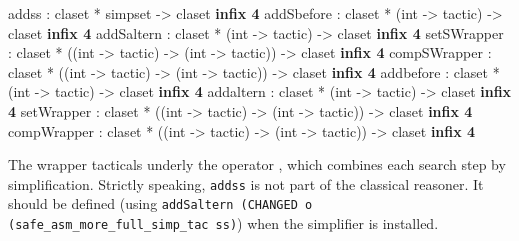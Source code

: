 \begin{ttbox} 
addss        : claset * simpset -> claset                 \hfill{\bf infix 4}
addSbefore   : claset *  (int -> tactic)  -> claset       \hfill{\bf infix 4}
addSaltern   : claset *  (int -> tactic)  -> claset       \hfill{\bf infix 4}
setSWrapper  : claset * ((int -> tactic) -> 
                         (int -> tactic)) -> claset       \hfill{\bf infix 4}
compSWrapper : claset * ((int -> tactic) -> 
                         (int -> tactic)) -> claset       \hfill{\bf infix 4}
addbefore    : claset *  (int -> tactic)  -> claset       \hfill{\bf infix 4}
addaltern    : claset *  (int -> tactic)  -> claset       \hfill{\bf infix 4}
setWrapper   : claset * ((int -> tactic) -> 
                         (int -> tactic)) -> claset       \hfill{\bf infix 4}
compWrapper  : claset * ((int -> tactic) -> 
                         (int -> tactic)) -> claset       \hfill{\bf infix 4}
\end{ttbox}
%
The wrapper tacticals underly the operator , which combines
each search step by simplification.  Strictly speaking, {\tt addss} is not
part of the classical reasoner.  It should be defined (using {\tt addSaltern (CHANGED o (safe_asm_more_full_simp_tac ss)}) when the simplifier is installed.

